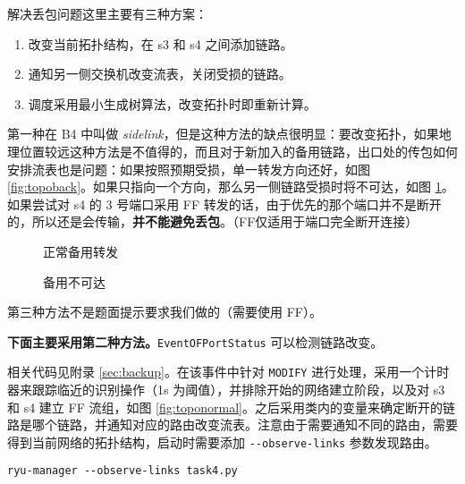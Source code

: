     解决丢包问题这里主要有三种方案：
    \begin{enumerate}
        \item 改变当前拓扑结构，在 s3 和 s4 之间添加链路。
        \item 通知另一侧交换机改变流表，关闭受损的链路。
        \item 调度采用最小生成树算法，改变拓扑时即重新计算。
    \end{enumerate}

    第一种在 B4 中叫做 \emph{sidelink}\cite{Hong2018}，但是这种方法的缺点很明显：要改变拓扑，如果地理位置较远这种方法是不值得的，而且对于新加入的备用链路，出口处的传包如何安排流表也是问题：如果按照预期受损，单一转发方向还好，如图 \ref{fig:topoback}。如果只指向一个方向，那么另一侧链路受损时将不可达，如图 \ref{fig:topoback2}。如果尝试对 s4 的 3 号端口采用 FF 转发的话，由于优先的那个端口并不是断开的，所以还是会传输，\textbf{并不能避免丢包}。（FF仅适用于端口完全断开连接）

    \begin{figure}[H]
        \centering
        \begin{minipage}{0.48\textwidth}
            \centering
            
            \caption{正常备用转发}\label{fig:topoback}
        \end{minipage}
        \begin{minipage}{0.48\textwidth}
            \centering
            
            \caption{备用不可达}\label{fig:topoback2}
        \end{minipage}
    \end{figure}

    第三种方法不是题面提示要求我们做的（需要使用 FF）。

    \textbf{下面主要采用第二种方法。}\verb"EventOFPortStatus" 可以检测链路改变。


    相关代码见附录 \ref{sec:backup}。在该事件中针对 \verb"MODIFY" 进行处理，采用一个计时器来跟踪临近的识别操作（1s 为阈值），并排除开始的网络建立阶段，以及对 s3 和 s4 建立 FF 流组，如图 \ref{fig:toponormal}。之后采用类内的变量来确定断开的链路是哪个链路，并通知对应的路由改变流表。注意由于需要通知不同的路由，需要得到当前网络的拓扑结构，启动时需要添加 \verb"--observe-links" 参数发现路由。

    \begin{lstlisting}[style=commandshell]
ryu-manager --observe-links task4.py\end{lstlisting}


